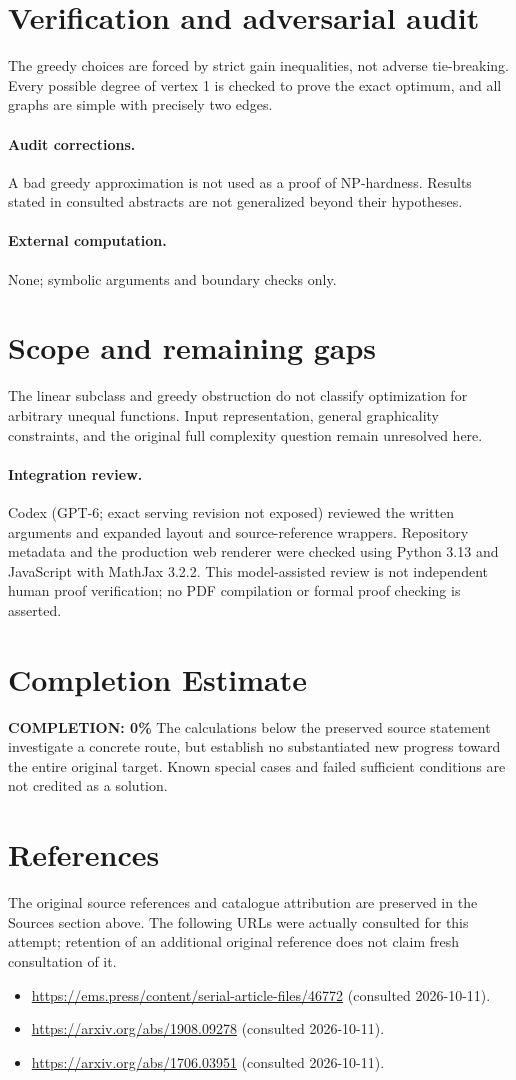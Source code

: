 \documentclass[11pt]{article}
\begin{document}
\section{Verification and adversarial audit}
The greedy choices are forced by strict gain inequalities, not adverse tie-breaking. Every possible degree of vertex 1 is checked to prove the exact optimum, and all graphs are simple with precisely two edges.
\paragraph{Audit corrections.} A bad greedy approximation is not used as a proof of NP-hardness. Results stated in consulted abstracts are not generalized beyond their hypotheses.
\paragraph{External computation.} None; symbolic arguments and boundary checks only.
\section{Scope and remaining gaps}
The linear subclass and greedy obstruction do not classify optimization for arbitrary unequal functions. Input representation, general graphicality constraints, and the original full complexity question remain unresolved here.
\paragraph{Integration review.} Codex (GPT-6; exact serving revision not exposed) reviewed the written arguments and expanded layout and source-reference wrappers. Repository metadata and the production web renderer were checked using Python 3.13 and JavaScript with MathJax 3.2.2. This model-assisted review is not independent human proof verification; no PDF compilation or formal proof checking is asserted.

\section{Completion Estimate}
\noindent\textbf{COMPLETION: 0\%}
The calculations below the preserved source statement investigate a concrete route,
but establish no substantiated new progress toward the entire original target.
Known special cases and failed sufficient conditions are not credited as a solution.
\section{References}
The original source references and catalogue attribution are preserved in the
Sources section above. The following URLs were actually consulted for this attempt;
retention of an additional original reference does not claim fresh consultation of it.
\begin{itemize}
\item \url{https://ems.press/content/serial-article-files/46772} (consulted 2026-10-11). 
\item \url{https://arxiv.org/abs/1908.09278} (consulted 2026-10-11). 
\item \url{https://arxiv.org/abs/1706.03951} (consulted 2026-10-11). 
\end{itemize}
\end{document}
